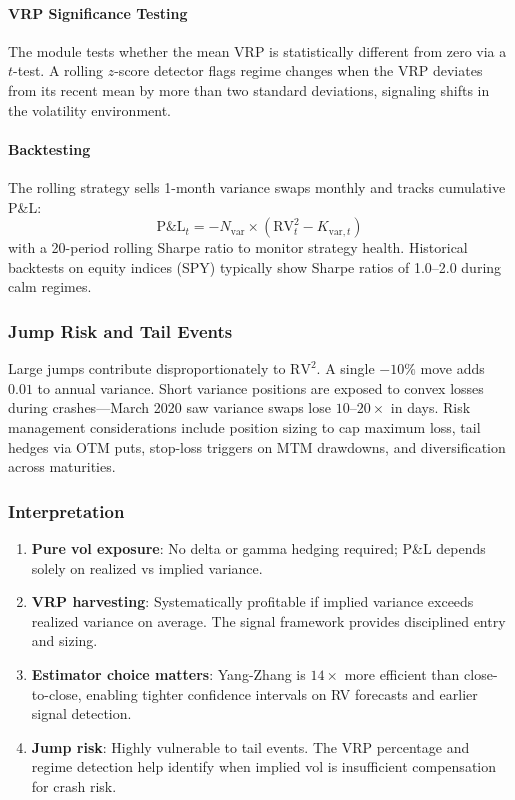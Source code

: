\paragraph{VRP Significance Testing}

The module tests whether the mean VRP is statistically different from zero via a $t$-test. A rolling $z$-score detector flags regime changes when the VRP deviates from its recent mean by more than two standard deviations, signaling shifts in the volatility environment.

\paragraph{Backtesting}

The rolling strategy sells 1-month variance swaps monthly and tracks cumulative P\&L:
\[
\text{P\&L}_t = -N_{\text{var}} \times (\text{RV}_t^2 - K_{\text{var},t})
\]
with a 20-period rolling Sharpe ratio to monitor strategy health. Historical backtests on equity indices (SPY) typically show Sharpe ratios of 1.0--2.0 during calm regimes.

\subsubsection{Jump Risk and Tail Events}

Large jumps contribute disproportionately to $\text{RV}^2$. A single $-10\%$ move adds $0.01$ to annual variance. Short variance positions are exposed to convex losses during crashes---March 2020 saw variance swaps lose $10$--$20\times$ in days. Risk management considerations include position sizing to cap maximum loss, tail hedges via OTM puts, stop-loss triggers on MTM drawdowns, and diversification across maturities.

\subsubsection{Interpretation}

\begin{enumerate}
  \item \textbf{Pure vol exposure}: No delta or gamma hedging required; P\&L depends solely on realized vs implied variance.

  \item \textbf{VRP harvesting}: Systematically profitable if implied variance exceeds realized variance on average. The signal framework provides disciplined entry and sizing.

  \item \textbf{Estimator choice matters}: Yang-Zhang is $14\times$ more efficient than close-to-close, enabling tighter confidence intervals on RV forecasts and earlier signal detection.

  \item \textbf{Jump risk}: Highly vulnerable to tail events. The VRP percentage and regime detection help identify when implied vol is insufficient compensation for crash risk.
\end{enumerate}

